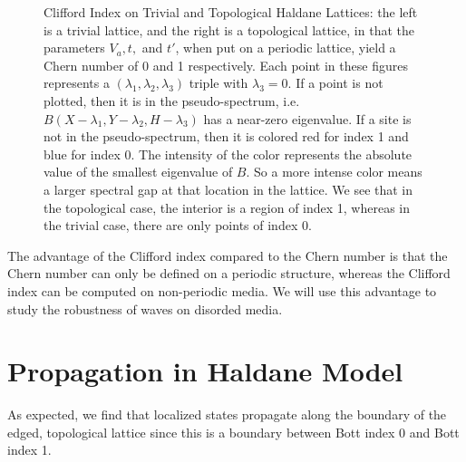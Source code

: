\documentclass[a4paper]{article}
\begin{document}
\begin{figure}
\centering
{}%
%
\caption{Clifford Index on Trivial and Topological Haldane Lattices: the left is a trivial lattice, and the right is a topological lattice, in that the parameters $V_a, t,$ and $t'$, when put on a periodic lattice, yield a Chern number of 0 and 1 respectively.
Each point in these figures represents a $(\lambda_1,\lambda_2,\lambda_3)$ triple with $\lambda_3 = 0$.
If a point is not plotted, then it is in the pseudo-spectrum, i.e. $B(X - \lambda_1, Y - \lambda_2, H - \lambda_3)$ has a near-zero eigenvalue.
If a site is not in the pseudo-spectrum, then it is colored red for index 1 and blue for index 0.
The intensity of the color represents the absolute value of the smallest eigenvalue of $B$.
So a more intense color means a larger spectral gap at that location in the lattice.
We see that in the topological case, the interior is a region of index 1, whereas in the trivial case, there are only points of index 0.
}%
\label{fig:haldane_index}%
\end{figure}
The advantage of the Clifford index compared to the Chern number is that the Chern number can only be defined on a periodic structure, whereas the Clifford index can be computed on non-periodic media.
We will use this advantage to study the robustness of waves on disorded media.

\section{Propagation in Haldane Model}
As expected, we find that localized states propagate along the boundary of the edged, topological lattice since this is a boundary between Bott index 0 and Bott index 1.
\end{document}
